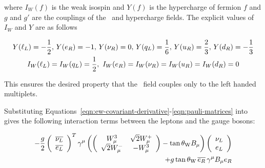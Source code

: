 
where $I_{W}(f)$ is the weak isospin and $Y(f)$ is the
hypercharge of fermion $f$ and $g$ and $g'$ are the couplings of the \sutwo\ and
hypercharge fields. The explicit values of $I_{W}$ and $Y$ are as
follows

\begin{gather}
Y(\ell_{L}) = - \frac{1}{2},\, Y(e_{R}) = - 1,\, Y(\nu_{R}) =0,\, Y(q_{L}) = \frac{1}{6},\, Y(u_{R}) = \frac{2}{3},\, Y(d_{R}) = - \frac{1}{3} \\
I_{W}(\ell_{L}) = I_{W}(q_{L}) = \frac{1}{2}, \  I_{W}(e_{R}) = I_{W}(\nu_{R}) =  I_{W}(u_{R}) = I_{W}(d_{R}) = 0 
\label{eqn:hypercharges}
\end{gather}

This ensures the desired property that the \sutwo\ field
couples only to the left handed multiplets. 


Substituting Equations~\ref{eqn:ew-covariant-derivative}-\ref{eqn:pauli-matrices}
 into~ gives the following
interaction terms between the leptons and the gauge bosons:

\begin{equation}
\begin{split}
- \frac{g}{2}
\left( \begin{array}{c}\overline{\nu_{L}} \\  \overline{e_{L}} \end{array} \right)^{T}
\gamma^{\mu} \left(
\left( \begin{array}{cc} W^{3}_{\mu} & \sqrt{2} W^{+}_{\mu} \\ \sqrt{2} W^{-}_{\mu} & -
W^{3}_{\mu} \end{array} \right)
- \tan{\ensuremath{\theta_{\mathrm{W}}}} B_{\mu} \right)
\left( \begin{array}{c} \nu_{L} \\  e_{L} \end{array} \right) \\
+ g \tan{\ensuremath{\theta_{\mathrm{W}}}} \, \overline{e_{R}} \, \gamma^{\mu} B_{\mu} e_{R}
\end{split}
\label{eqn:ew-lepton-interactions}
\end{equation}

